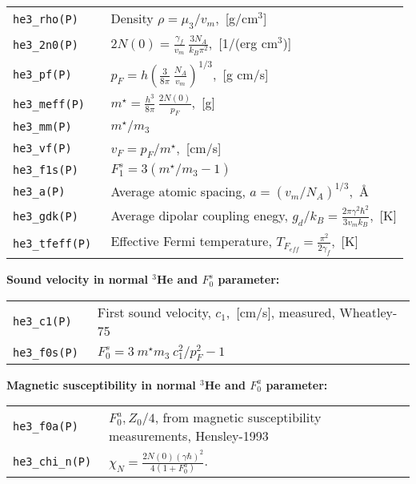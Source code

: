 \documentclass[a4paper]{article}
\begin{document}
\medskip
\noindent\begin{tabular}{lp{11cm}}
\tt he3\_rho(P)    & Density $\rho = \mu_3/v_m$,~[g/cm$^3$]\\
\tt he3\_2n0(P)    & $\displaystyle 2N(0) = \frac{\gamma_f}{v_m}
                     \ \frac{3 N_A}{k_B \pi^2}$,~[1/(erg cm$^3$)]\\[3mm]
\tt he3\_pf(P)     & $\displaystyle p_F = h \left(\frac{3}{8\pi}
                     \ \frac{N_A}{v_m}\right)^{1/3}$,~[g cm/s]\\[3mm]
\tt he3\_meff(P)   & $\displaystyle m^\star = \frac{h^3}{8\pi}
                     \ \frac{2N(0)}{p_F}$,~[g]\\[3mm]
\tt he3\_mm(P)     &$m^\star/m_3$\\
\tt he3\_vf(P)     &$\displaystyle v_F = p_F/m^\star$,~[cm/s]\\
\tt he3\_f1s(P)    &$\displaystyle F_1^s = 3(m^\star/m_3 - 1)$\\
\tt he3\_a(P)      &Average atomic spacing,
                    $\displaystyle a=(v_m/N_A)^{1/3}$,~\AA\\
\tt he3\_gdk(P)    &Average dipolar coupling enegy,
                    $\displaystyle g_d/k_B = \frac{2\pi\gamma^2\hbar^2}{3 v_m k_B}$,~[K]\\
\tt he3\_tfeff(P)  &Effective Fermi temperature,
                    $\displaystyle T_{F_{eff}} = \frac{\pi^2}{2\gamma_f}$,~[K]\\
\end{tabular}
\medskip

{\bf Sound velocity in normal $^3$He and $F_0^s$ parameter:}

\medskip
\noindent\begin{tabular}{lp{11cm}}
\tt he3\_c1(P)     & First sound velocity, $c_1$,~[cm/s], measured, Wheatley-75\\
\tt he3\_f0s(P)    &$\displaystyle F_0^s = 3\ m^\star m_3\ c_1^2 / p_F^2 - 1$\\
\end{tabular}
\medskip

{\bf Magnetic susceptibility in normal $^3$He and $F_0^a$ parameter:}

\medskip
\noindent\begin{tabular}{lp{11cm}}
\tt he3\_f0a(P)    &$F_0^a, Z_0/4$, from magnetic susceptibility measurements, Hensley-1993\\
\tt he3\_chi\_n(P) &$\displaystyle \chi_{N} =
                     \frac{ 2N(0)(\gamma\hbar)^2}{4(1 + F_0^a)}$.\\[3mm]
\end{tabular}
\medskip
\end{document}

